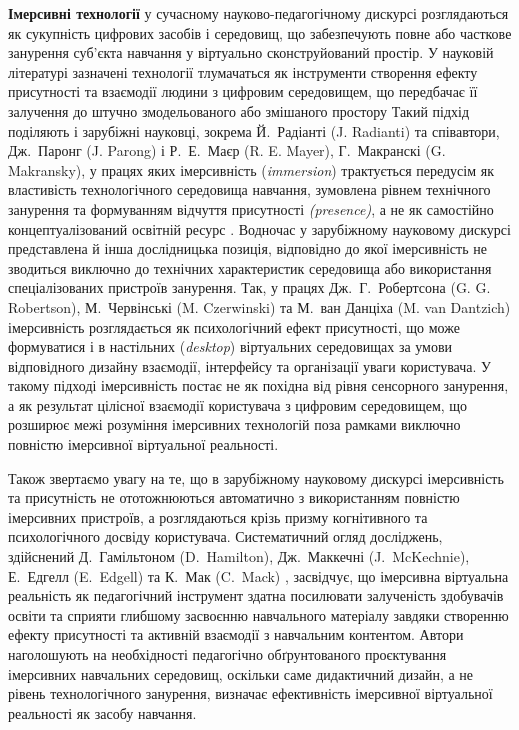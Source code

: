 \textbf{Імерсивні технології} у сучасному науково-педагогічному дискурсі розглядаються як сукупність цифрових засобів і середовищ, що забезпечують повне або часткове занурення суб'єкта навчання у віртуально сконструйований простір. У науковій літературі зазначені технології тлумачаться як інструменти створення ефекту присутності та взаємодії людини з цифровим середовищем, що передбачає її залучення до штучно змодельованого або змішаного простору \cite{Semerikov2023Presence} Такий підхід поділяють і зарубіжні науковці, зокрема Й.~Радіанті (J. Radianti) та співавтори, Дж.~Паронг (J. Parong) і Р.~Е.~Маєр (R. E. Mayer), Г.~Макранскі (G. Makransky), у працях яких імерсивність (\emph{immersion}) трактується передусім як властивість технологічного середовища навчання, зумовлена рівнем технічного занурення та формуванням відчуття присутності \emph{(presence)}, а не як самостійно концептуалізований освітній ресурс \cite{Parong2021Cognitive}. Водночас у зарубіжному науковому дискурсі представлена й інша дослідницька позиція, відповідно до якої імерсивність не зводиться виключно до технічних характеристик середовища або використання спеціалізованих пристроїв занурення. Так, у працях Дж.~Г.~Робертсона (G. G. Robertson), М.~Червінські (M. Czerwinski) та М.~ван Данціха (M. van Dantzich) імерсивність розглядається як психологічний ефект присутності, що може формуватися і в настільних (\emph{desktop}) віртуальних середовищах за умови відповідного дизайну взаємодії, інтерфейсу та організації уваги користувача. У такому підході імерсивність постає не як похідна від рівня сенсорного занурення, а як результат цілісної взаємодії користувача з цифровим середовищем, що розширює межі розуміння імерсивних технологій поза рамками виключно повністю імерсивної віртуальної реальності\cite{Krokos2019Virtual}.

Також звертаємо увагу на те, що в зарубіжному науковому дискурсі імерсивність та присутність не ототожнюються автоматично з використанням повністю імерсивних пристроїв, а розглядаються крізь призму когнітивного та психологічного досвіду користувача. Систематичний огляд досліджень, здійснений Д.~Гамільтоном (D.~Hamilton), Дж.~Маккечні (J.~McKechnie), Е.~Едгелл (E.~Edgell) та К.~Мак (C.~Mack) \cite{Kennedy2023Immersive}, засвідчує, що імерсивна віртуальна реальність як педагогічний інструмент здатна посилювати залученість здобувачів освіти та сприяти глибшому засвоєнню навчального матеріалу завдяки створенню ефекту присутності та активній взаємодії з навчальним контентом. Автори наголошують на необхідності педагогічно обґрунтованого проєктування імерсивних навчальних середовищ, оскільки саме дидактичний дизайн, а не рівень технологічного занурення, визначає ефективність імерсивної віртуальної реальності як засобу навчання.

